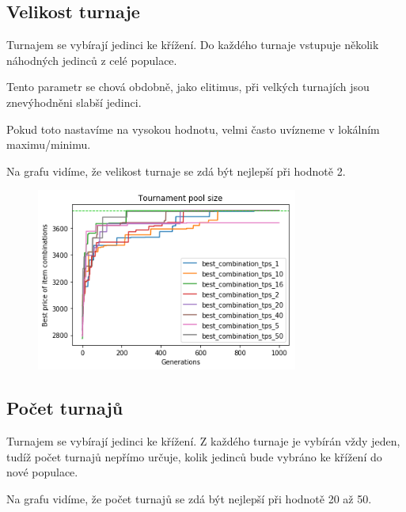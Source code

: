 \documentclass[a4paper,10pt,twocolumn]{article}
\begin{document}
\begin{itemize}
\begin{itemize}
\subsection{Velikost turnaje}

Turnajem se vybírají jedinci ke křížení. Do každého turnaje vstupuje několik náhodných jedinců z celé populace.

Tento parametr se chová obdobně, jako elitimus, při velkých turnajích jsou znevýhodněni slabší jedinci.

Pokud toto nastavíme na vysokou hodnotu, velmi často uvízneme v lokálním maximu/minimu.

Na grafu vidíme, že velikost turnaje se zdá být nejlepší při hodnotě 2.


\begin{figure}[H]
  \begin{center}
    \includegraphics[height=6cm]{graphs/tournament_pool_size.png}
  \end{center}
\end{figure}



\subsection{Počet turnajů}

Turnajem se vybírají jedinci ke křížení. Z každého turnaje je vybírán vždy jeden, tudíž počet turnajů nepřímo určuje, kolik jedinců bude vybráno ke křížení do nové populace.


Na grafu vidíme, že počet turnajů se zdá být nejlepší při hodnotě 20 až 50.




\end{itemize}
\end{itemize}
\end{document}
